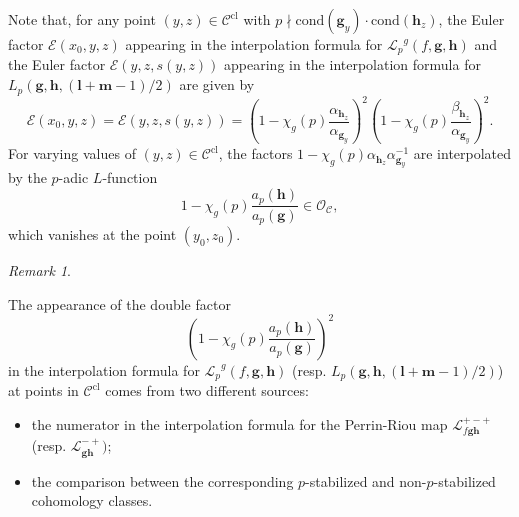 \documentclass[a4paper,11pt]{amsart}
\theoremstyle{plain}
\theoremstyle{definition}
\theoremstyle{remark}
\newtheorem{remarkwr}[theorem]{Remark}
\newenvironment{remark}{\begin{remarkwr}\begin{upshape}}{\end{upshape}\end{remarkwr}}
\newcommand{\cl}{\mathcal}
\newcommand{\Lp}{{\mathscr{L}_p}}
\newcommand{\hg}{{\mathbf{g}}}
\newcommand{\hh}{{\mathbf h}}
\numberwithin{equation}{section}
\begin{document}
Note that, for any point $(y,z)\in \cl{C}^{\mathrm{cl}}$ with $p\nmid \mathrm{cond}(\hg_y)\cdot\mathrm{cond}(\hh_z)$, the Euler factor $\cl{E}(x_0,y,z)$ appearing in the interpolation formula for $\Lp^g(f,\hg,\hh)$ and the Euler factor $\cl{E}(y,z,s(y,z))$ appearing in the interpolation formula for $L_p(\hg,\hh,(\mathbf{l}+\mathbf{m}-1)/2)$ are given by
\[
\cl{E}(x_0,y,z)=\cl{E}(y,z,s(y,z))=\left(1-\chi_g(p)\frac{\alpha_{\hh_z}}{\alpha_{\hg_y}}\right)^2 \left(1-\chi_g(p)\frac{\beta_{\hh_z}}{\alpha_{\hg_y}}\right)^2.
\]
For varying values of $(y,z)\in \cl{C}^{\mathrm{cl}}$, the factors $1-\chi_g(p)\alpha_{\hh_z}\alpha_{\hg_y}^{-1}$ are interpolated by the $p$-adic $L$-function
\[
1-\chi_g(p)\frac{a_p(\hh)}{a_p(\hg)} \in \cl{O}_{\cl{C}},
\]
which vanishes at the point $(y_0,z_0)$.


\begin{remark}
The appearance of the double factor
\[
\left(1-\chi_g(p)\frac{a_p(\hh)}{a_p(\hg)}\right)^2
\]
in the interpolation formula for $\Lp^g(f,\hg,\hh)$ (resp. $L_p(\hg,\hh,(\mathbf{l}+\mathbf{m}-1)/2)$) at points in $\cl{C}^{\mathrm{cl}}$ comes from two different sources:
\begin{itemize}
    \item the numerator in the interpolation formula for the Perrin-Riou map $\cl{L}_{f\hg\hh}^{+-+}$ (resp. $\cl{L}_{\hg\hh}^{-+})$;
    \item the comparison between the corresponding $p$-stabilized and non-$p$-stabilized cohomology classes.
\end{itemize}
\end{remark}
\end{document}
